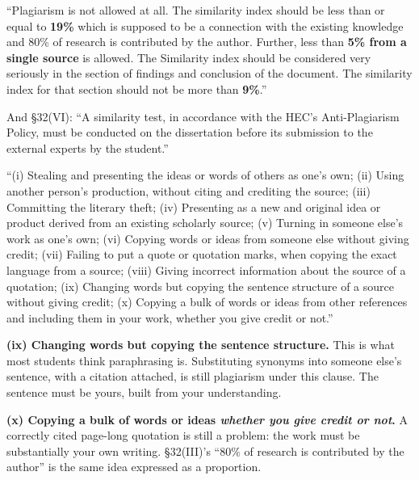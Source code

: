 \begin{regbox}
``Plagiarism is not allowed at all. The similarity index should be less than or
equal to \textbf{19\%} which is supposed to be a connection with the existing
knowledge and 80\% of research is contributed by the author. Further, less than
\textbf{5\% from a single source} is allowed. The Similarity index should be
considered very seriously in the section of findings and conclusion of the
document. The similarity index for that section should not be more than
\textbf{9\%}.''

\medskip
And \S32(VI): ``A similarity test, in accordance with the HEC's Anti-Plagiarism
Policy, must be conducted on the dissertation before its submission to the
external experts by the student.''
\end{regbox}

\begin{regbox}
``(i) Stealing and presenting the ideas or words of others as one's own;
(ii) Using another person's production, without citing and crediting the
source; (iii) Committing the literary theft; (iv) Presenting as a new and
original idea or product derived from an existing scholarly source;
(v) Turning in someone else's work as one's own; (vi) Copying words or ideas
from someone else without giving credit; (vii) Failing to put a quote or
quotation marks, when copying the exact language from a source; (viii) Giving
incorrect information about the source of a quotation; (ix) Changing words but
copying the sentence structure of a source without giving credit; (x) Copying a
bulk of words or ideas from other references and including them in your work,
whether you give credit or not.''
\end{regbox}

\begin{alertbox}
\textbf{(ix) Changing words but copying the sentence structure.} This is what
most students think paraphrasing is. Substituting synonyms into someone else's
sentence, with a citation attached, is still plagiarism under this clause. The
sentence must be yours, built from your understanding.

\medskip
\textbf{(x) Copying a bulk of words or ideas \emph{whether you give credit or
not}.} A correctly cited page-long quotation is still a problem: the work must
be substantially your own writing. \S32(III)'s ``80\% of research is
contributed by the author'' is the same idea expressed as a proportion.
\end{alertbox}

